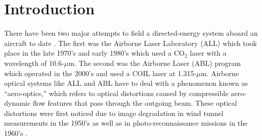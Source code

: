 
\chapter{Introduction}
\label{chap:01_intro}

There have been two major attempts to field a directed-energy system aboard an aircraft to date \cite{Jumper-2013-8KtN3pue}.
The first was the Airborne Laser Laboratory (ALL) which took place in the late 1970's and early 1980's which used a CO$_2$ laser with a wavelength of 10.6-$\mu$m.
The second was the Airborne Laser (ABL) program which operated in the 2000's and used a COIL laser at 1.315-$\mu$m.
Airborne optical systems like ALL and ABL have to deal with a phenomenon known as ``aero-optics,'' which refers to optical distortions caused by compressible aero-dynamic flow features that pass through the outgoing beam.
These optical distortions were first noticed due to image degradation in wind tunnel measurements in the 1950's \cite{Stine-1956-UaRzVZCe} as well as in photo-reconnaissance missions in the 1960's \cite{Kyrazis-2013-vwKeEBym}.

